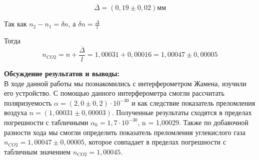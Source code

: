 \documentclass[a4paper, 12pt]{article}%
\begin{document}
\begin{enumerate}
	$$ \overline{\Delta} =  (0,19 \pm 0,02) \text{мм}$$ 	
	
	Так как $n_2 - n_1 = \delta n$, а $\delta n = \frac{\overline{\Delta}}{l}$ 
	
	Тогда 
	\begin{equation}
		n_{CO2} = n +  \frac{\overline{\Delta}}{l}= 1,00031 + 0,00016 = 1,00047 \pm 0,00005
	\end{equation} 
		
	\end{enumerate}
	
	\textbf{Обсуждение результатов и выводы: }\\
	
	В ходе данной работы мы познакомились с интерферометром Жамена, изучили его устройство. С помощью данного интерферометра смогли рассчитать поляризуемость $\alpha = (2,0 \pm 0,2) \cdot 10^{-30}$ и как следствие показатель преломления воздуха $n = (1,00031 \pm 0,00003)$. Полученные результаты сходятся в пределах погрешности с табличными  $\alpha_0 = 1,7 \cdot 10^{-30}$, n = 1,00029. Также по добавочной разности хода мы смогли определить показатель преломления углекислого газа $n_{CO2} = 1,00047 \pm 0,00005$, которое совпадает в пределах погрешности с табличным значением $n_{CO2} = 1,00045$.
	
	
	
	
	
	
	
	
	
	
	
	
	
	
	
	
	
	
	
	
	
	
\end{document}
